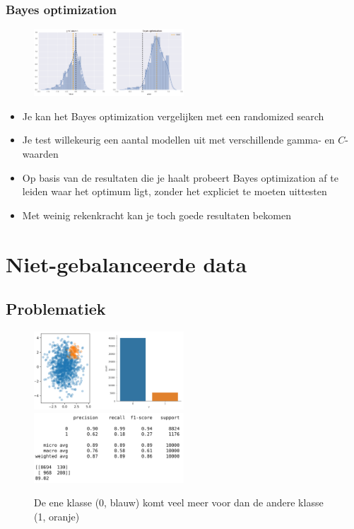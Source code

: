 \documentclass{article}
\begin{document}
\subsubsection{Bayes optimization}

\begin{figure}[H]
    \centering
    \includegraphics[width=0.5\textwidth]{bayes-optimization.png}
    \caption{}
\end{figure}

\begin{itemize}
    \item Je kan het Bayes optimization vergelijken met een randomized search
    \item Je test willekeurig een aantal modellen uit met verschillende gamma- en $C$-waarden
    \item Op basis van de resultaten die je haalt probeert Bayes optimization af te leiden waar het optimum ligt, zonder het expliciet te moeten uittesten
    \item Met weinig rekenkracht kan je toch goede resultaten bekomen
\end{itemize}

\section{Niet-gebalanceerde data}

\subsection{Problematiek}

\begin{figure}[H]
    \centering
    \includegraphics[width=0.5\textwidth]{niet-gebalanceerde-data-problematiek.png}
    \includegraphics[width=0.5\textwidth]{niet-gebalanceerde-data-problematiek2.png}
    \caption{De ene klasse (0, blauw) komt veel meer voor dan de andere klasse (1, oranje)}
\end{figure}
\end{document}

